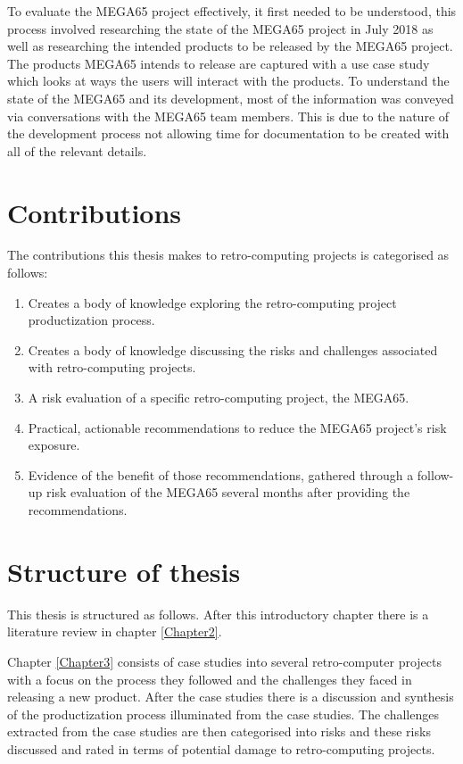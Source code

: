 To evaluate the MEGA65 project effectively, it first needed to be understood, this process involved researching the state of the MEGA65 project in July 2018 as well as researching the intended products to be released by the MEGA65 project. The products MEGA65 intends to release are captured with a use case study which looks at ways the users will interact with the products. To understand the state of the MEGA65 and its development, most of the information was conveyed via conversations with the MEGA65 team members. This is due to the nature of the development process not allowing time for documentation to be created with all of the relevant details. 

\section{Contributions}
The contributions this thesis makes to retro-computing projects is categorised as follows:
\begin{enumerate}
\item Creates a body of knowledge exploring the retro-computing project productization process.
\item Creates a body of knowledge discussing the risks and challenges associated with retro-computing projects.
\item A risk evaluation of a specific retro-computing project, the MEGA65.
\item Practical, actionable recommendations to reduce the MEGA65 project's risk exposure.
\item Evidence of the benefit of those recommendations, gathered through a follow-up risk evaluation of the MEGA65 several months after providing the recommendations.
\end{enumerate}

\section{Structure of thesis}
This thesis is structured as follows. After this introductory chapter there is a literature review in chapter \ref{Chapter2}. 

Chapter \ref{Chapter3} consists of case studies into several retro-computer projects with a focus on the process they followed and the challenges they faced in releasing a new product. After the case studies there is a discussion and synthesis of the productization process illuminated from the case studies. The challenges extracted from the case studies are then categorised into risks and these risks discussed and rated in terms of potential damage to retro-computing projects. 

